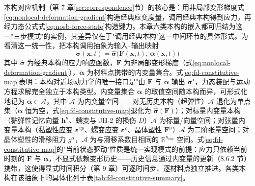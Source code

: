 本构对应机制（第 7 章\ref{sec:correspondence}节）的核心是：用非局部变形梯度式\eqref{eq:nonlocal-deformation-gradient}构造经典应变度量，调用经典本构得到应力，再经力态公式式\eqref{eq:nosb-force-state}构造键力。本章六类本构的嵌入都可归结为这一"三步模式"的实例，其差异仅在于"调用经典本构"这一中间环节的具体形式。为看清这一统一性，把本构调用抽象为输入--输出映射
\begin{equation}
  \boldsymbol{\sigma}(\mathbf{x},t)=\hat{\boldsymbol{\sigma}}\bigl(\mathbf{F}(\mathbf{x},t),\,\boldsymbol{\alpha}(\mathbf{x},t)\bigr)
  \label{eq:fd-constitutive-map}
\end{equation}
其中 $\hat{\boldsymbol{\sigma}}$ 为经典本构的应力响应函数，$\mathbf{F}$ 为非局部变形梯度（式\eqref{eq:nonlocal-deformation-gradient}），$\boldsymbol{\alpha}$ 为材料点携带的内变量集合。式\eqref{eq:fd-constitutive-map}表明：本构对近场动力学的唯一接口是"由 $\mathbf{F}$ 与 $\boldsymbol{\alpha}$ 输出 $\boldsymbol{\sigma}$"，力态装配与运动方程求解完全独立于本构类型。内变量集合 $\boldsymbol{\alpha}$ 的取值空间随本构而异，可形式化地记为 $\boldsymbol{\alpha}\in\mathcal{A}$，其中 $\mathcal{A}$ 为内变量空间——对无历史本构（超弹性）$\mathcal{A}$ 退化为单点集（$\boldsymbol{\alpha}$ 恒为空，式\eqref{eq:fd-constitutive-map}退化为 $\hat{\boldsymbol{\sigma}}(\mathbf{F})$）；对标量内变量本构（黏弹性记忆向量 $\mathbf{h}^{n}$、蠕变与 JH-2 的损伤 $D$）$\mathcal{A}$ 为标量/向量空间；对张量内变量本构（黏塑性应变 $\boldsymbol{\varepsilon}^{vp}$、蠕变应变 $\boldsymbol{\varepsilon}^{c}$、晶体塑性 $\mathbf{F}^{\mathrm{p}}$）$\mathcal{A}$ 为二阶张量空间；对晶体塑性的滑移阻力 $g^{\alpha}$，$\mathcal{A}$ 为与滑移系数目相同的 $\mathbb{R}^{n_{\mathrm{slip}}}$ 空间。式\eqref{eq:fd-constitutive-map}的"当前状态驱动"性质是统一实现模式的前提：应力只依赖当前时刻的 $\mathbf{F}$ 与 $\boldsymbol{\alpha}$，不显式依赖变形历史——历史信息通过内变量的更新（8.6.2 节）携带，这使得显式时间积分（第 9 章）可逐时间步、逐材料点独立推进。各类本构在该抽象下的具体化列于表\ref{tab:fd-constitutive-summary}。

